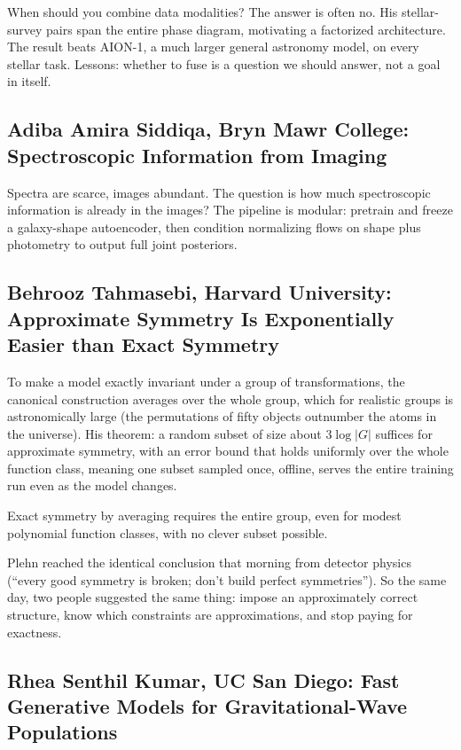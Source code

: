 \documentclass[11pt]{article}
\begin{document}
When should you combine data modalities? The answer is often no. His stellar-survey pairs span the entire phase diagram, motivating a factorized architecture. The result beats AION-1, a much larger general astronomy model, on every stellar task. Lessons: whether to fuse is a question we should answer, not a goal in itself.

\subsection*{Adiba Amira Siddiqa, Bryn Mawr College: Spectroscopic Information from Imaging}

Spectra are scarce, images abundant. The question is how much spectroscopic information is already in the images? The pipeline is modular: pretrain and freeze a galaxy-shape autoencoder, then condition normalizing flows on shape plus photometry to output full joint posteriors.

\subsection*{Behrooz Tahmasebi, Harvard University: Approximate Symmetry Is Exponentially Easier than Exact Symmetry}

To make a model exactly invariant under a group of transformations, the canonical construction averages over the whole group, which for realistic groups is astronomically large (the permutations of fifty objects outnumber the atoms in the universe). His theorem: a random subset of size about $3\log|G|$ suffices for approximate symmetry, with an error bound that holds uniformly over the whole function class, meaning one subset sampled once, offline, serves the entire training run even as the model changes.

Exact symmetry by averaging requires the entire group, even for modest polynomial function classes, with no clever subset possible.

Plehn reached the identical conclusion that morning from detector physics (``every good symmetry is broken; don't build perfect symmetries''). So the same day, two people suggested the same thing: impose an approximately correct structure, know which constraints are approximations, and stop paying for exactness.

\subsection*{Rhea Senthil Kumar, UC San Diego: Fast Generative Models for Gravitational-Wave Populations}
\end{document}
